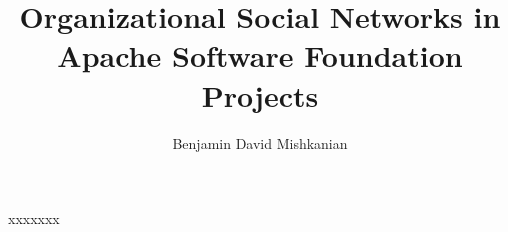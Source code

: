 


\title{Organizational Social Networks in Apache Software Foundation Projects}
\author{Benjamin David Mishkanian}









\begin{frontmatter}
\maketitle





\tableofcontents
\listoffigures
\listoftables

    \newpage
    \begin{inlineabstract}
		\myabstract
		
    \end{inlineabstract}

\begin{acknowledgments}
xxxxxxx
\end{acknowledgments}

\end{frontmatter}
